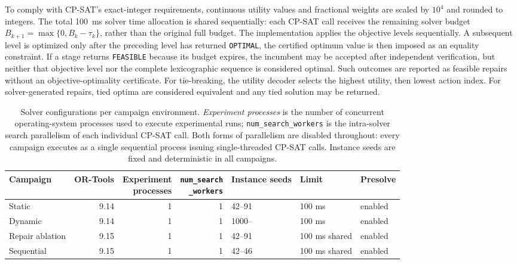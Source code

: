 \documentclass[pdflatex,sn-mathphys-num,iicol,oneside]{sn-jnl}
\newcommand{\cpsat}{\textsc{CP-SAT}\xspace}
\begin{document}
To comply with \cpsat's exact-integer requirements, continuous utility values and fractional weights are scaled by $10^4$ and rounded to integers. The total 100~ms solver time allocation is shared sequentially: each CP-SAT call receives the remaining solver budget $B_{k+1}=\max\{0,B_k-\tau_k\}$, rather than the original full budget. The implementation applies the objective levels sequentially. A subsequent level is optimized only after the preceding level has returned \texttt{OPTIMAL}, the certified optimum value is then imposed as an equality constraint. If a stage returns \texttt{FEASIBLE} because its budget expires, the incumbent may be accepted after independent verification, but neither that objective level nor the complete lexicographic sequence is considered optimal. Such outcomes are reported as feasible repairs without an objective-optimality certificate. For tie-breaking, the utility decoder selects the highest utility, then lowest action index. For solver-generated repairs, tied optima are considered equivalent and any tied solution may be returned.

\begin{table}[t]
\centering
\caption{Solver configurations per campaign environment.
\emph{Experiment processes} is the number of concurrent
operating-system processes used to execute experimental runs;
\texttt{num\_search\_workers} is the intra-solver search parallelism
of each individual \cpsat call. Both forms of parallelism are
disabled throughout: every campaign executes as a single sequential
process issuing single-threaded \cpsat calls. Instance seeds are
fixed and deterministic in all campaigns.}
\label{tab:solver-config}
\setlength{\tabcolsep}{4pt}
\small
\begin{tabular}{lrrrlll}
\toprule
Campaign & OR-Tools &
\shortstack[r]{Experiment\\processes} &
\shortstack[r]{\texttt{num\_search}\\\texttt{\_workers}} &
Instance seeds & Limit & Presolve \\
\midrule
Static & 9.14 & 1 & 1 & 42--91 & 100 ms & enabled \\
Dynamic & 9.14 & 1 & 1 & 1000-- & 100 ms & enabled \\
Repair ablation & 9.15 & 1 & 1 & 42--91 & 100 ms shared & enabled \\
Sequential & 9.15 & 1 & 1 & 42--46 & 100 ms shared & enabled \\
\bottomrule
\end{tabular}
\end{table}
\end{document}

